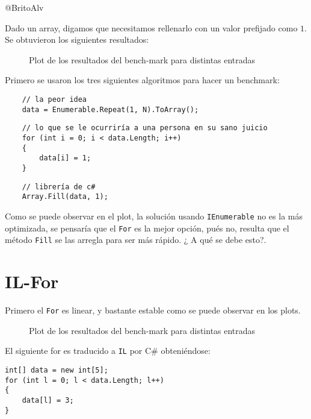 \documentclass[14pt]{extarticle}
\begin{document}
@BritoAlv



\begin{tcolorbox}[colback=blue!5!white,colframe=blue!75!black, title = Fastest way to fill an array with 1's]

    Dado un array, digamos que necesitamos rellenarlo con un valor prefijado como $1$. Se obtuvieron los siguientes resultados:
\end{tcolorbox}

\begin{figure}[htbp]
    \centering
    
    \caption{Plot de los resultados del bench-mark para distintas entradas}
\end{figure}

Primero se usaron los tres siguientes algoritmos para hacer un benchmark:

\begin{verbatim}
    // la peor idea 
    data = Enumerable.Repeat(1, N).ToArray();
\end{verbatim}

\begin{verbatim}
    // lo que se le ocurriría a una persona en su sano juicio
    for (int i = 0; i < data.Length; i++)
    {
        data[i] = 1;
    }
\end{verbatim}

\begin{verbatim}
    // librería de c#
    Array.Fill(data, 1);
\end{verbatim}

Como se puede observar en el plot, la solución usando \texttt{IEnumerable} no es la más optimizada, se pensaría que el  \texttt{For} es la mejor opción, pués no, resulta que el método \texttt{Fill} se las arregla para ser más rápido. ¿ A qué se debe esto?.

\section{IL-For}
Primero el \texttt{For} es linear, y bastante estable como se puede observar en los plots.

\begin{figure}[htbp]
    \centering
    
    \caption{Plot de los resultados del bench-mark para distintas entradas}
\end{figure}

El siguiente for es traducido a \texttt{IL} por C\# obteniéndose:
\begin{verbatim}
int[] data = new int[5];
for (int l = 0; l < data.Length; l++)
{
    data[l] = 3;
} 
\end{verbatim}
\end{document}
